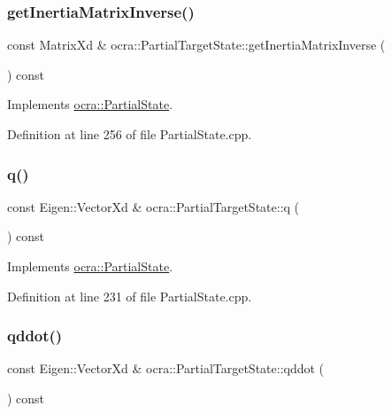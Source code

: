 \subsubsection{\texorpdfstring{get\+Inertia\+Matrix\+Inverse()}{getInertiaMatrixInverse()}}
{\footnotesize\ttfamily const Matrix\+Xd \& ocra\+::\+Partial\+Target\+State\+::get\+Inertia\+Matrix\+Inverse (\begin{DoxyParamCaption}{ }\end{DoxyParamCaption}) const\hspace{0.3cm}{\ttfamily [virtual]}}



Implements \hyperlink{classocra_1_1PartialState_a83979e39dd3631861c724514e49cb8b4}{ocra\+::\+Partial\+State}.



Definition at line 256 of file Partial\+State.\+cpp.

\hypertarget{classocra_1_1PartialTargetState_af953d48bac74ff93ed79d4c75bde207f}{}\label{classocra_1_1PartialTargetState_af953d48bac74ff93ed79d4c75bde207f} 
\subsubsection{\texorpdfstring{q()}{q()}}
{\footnotesize\ttfamily const Eigen\+::\+Vector\+Xd \& ocra\+::\+Partial\+Target\+State\+::q (\begin{DoxyParamCaption}{ }\end{DoxyParamCaption}) const\hspace{0.3cm}{\ttfamily [virtual]}}



Implements \hyperlink{classocra_1_1PartialState_a28f537d2c569eddb7f7d6dbbea073226}{ocra\+::\+Partial\+State}.



Definition at line 231 of file Partial\+State.\+cpp.

\hypertarget{classocra_1_1PartialTargetState_a450c270ee9583ad7cde6a91630045792}{}\label{classocra_1_1PartialTargetState_a450c270ee9583ad7cde6a91630045792} 
\subsubsection{\texorpdfstring{qddot()}{qddot()}}
{\footnotesize\ttfamily const Eigen\+::\+Vector\+Xd \& ocra\+::\+Partial\+Target\+State\+::qddot (\begin{DoxyParamCaption}{ }\end{DoxyParamCaption}) const\hspace{0.3cm}{\ttfamily [virtual]}}



